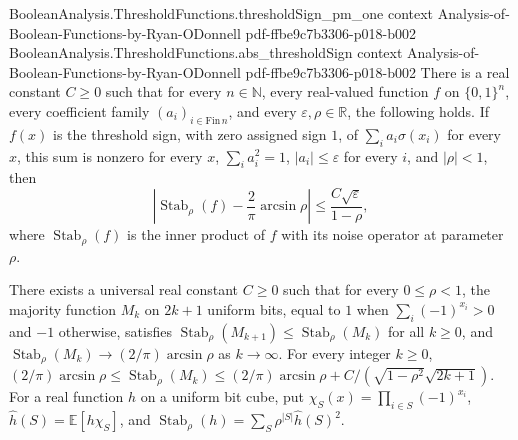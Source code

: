 \begin{theorem}
\proofstep
  {BooleanAnalysis.ThresholdFunctions.thresholdSign_pm_one}
  {context}
  {Analysis-of-Boolean-Functions-by-Ryan-ODonnell}
  {pdf-ffbe9c7b3306-p018-b002}
\proofstep
  {BooleanAnalysis.ThresholdFunctions.abs_thresholdSign}
  {context}
  {Analysis-of-Boolean-Functions-by-Ryan-ODonnell}
  {pdf-ffbe9c7b3306-p018-b002}
There is a real constant $C\geq0$ such that for every $n\in\mathbb N$, every real-valued
function $f$ on $\{0,1\}^n$, every coefficient family $(a_i)_{i\in\mathrm{Fin}\,n}$, and
every $\varepsilon,\rho\in\mathbb R$, the following holds. If $f(x)$ is the threshold
sign, with zero assigned sign $1$, of $\sum_i a_i\sigma(x_i)$ for every $x$, this sum is
nonzero for every $x$, $\sum_i a_i^2=1$, $|a_i|\leq\varepsilon$ for every $i$, and
$|\rho|<1$, then
\[\left|\operatorname{Stab}_\rho(f)-\frac{2}{\pi}\arcsin\rho\right|\leq\frac{C\sqrt{\varepsilon}}{1-\rho},\]
where $\operatorname{Stab}_\rho(f)$ is the inner product of $f$ with its noise operator
at parameter $\rho$.
\end{theorem}

\begin{theorem}
\leanok
{}
There exists a universal real constant $C\ge0$ such that for every $0\le\rho<1$, the majority function $M_k$ on $2k+1$ uniform bits, equal to $1$ when $\sum_i(-1)^{x_i}>0$ and $-1$ otherwise, satisfies $\operatorname{Stab}_\rho(M_{k+1})\le\operatorname{Stab}_\rho(M_k)$ for all $k\ge0$, and $\operatorname{Stab}_\rho(M_k)\to(2/\pi)\arcsin\rho$ as $k\to\infty$. For every integer $k\ge0$, $(2/\pi)\arcsin\rho\le\operatorname{Stab}_\rho(M_k)\le(2/\pi)\arcsin\rho+C/(\sqrt{1-\rho^2}\sqrt{2k+1})$. For a real function $h$ on a uniform bit cube, put $\chi_S(x)=\prod_{i\in S}(-1)^{x_i}$, $\widehat h(S)=\mathbb E[h\chi_S]$, and $\operatorname{Stab}_\rho(h)=\sum_S\rho^{|S|}\widehat h(S)^2$.
\end{theorem}

